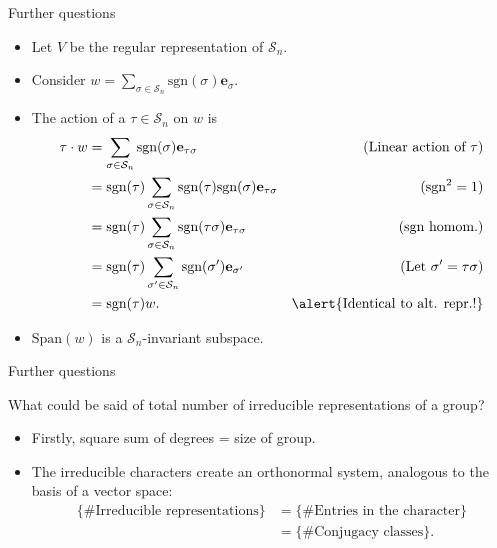 \documentclass[10pt]{beamer}
\newcommand{\Sym}{\mathcal{S}}
\newcommand{\sgn}{\text{sgn}}
\newcommand{\bas}{\mathbf{e}}
\newcommand{\Span}{\text{Span}}
\begin{document}
\begin{frame}{Further questions}
	\begin{example}
		\begin{itemize}
			\item Let $V$ be the regular representation of $\Sym_n$.
			
			\item Consider $w = \sum_{\sigma \in \Sym_n} \sgn(\sigma)\bas_\sigma$.
			
			\item The action of a $\tau \in \Sym_n$ on $w$ is \begin{align*}
				\tau \cdot w &= \sum_{\sigma \in \Sym_n} \sgn(\sigma)\bas_{\tau\sigma} & \text{(Linear action of $\tau$)} \\ 
				&= \sgn(\tau)\sum_{\sigma \in \Sym_n} \sgn(\tau)\sgn(\sigma)\bas_{\tau\sigma} & \text{($\sgn^2 = 1$)}\\
				&= \sgn(\tau)\sum_{\sigma \in \Sym_n} \sgn(\tau\sigma)\bas_{\tau\sigma} & \text{(sgn homom.)} \\
				&= \sgn(\tau)\sum_{\sigma' \in \Sym_n} \sgn(\sigma')\bas_{\sigma'} & \text{(Let $\sigma' = \tau\sigma$)} \\
				&= \sgn(\tau) w. & \text{\alert{Identical to alt. repr.!}}
			\end{align*}	
			
			
			\item $\Span(w)$ is a $\Sym_n$-invariant subspace.
		\end{itemize}
		\end{example}
\end{frame}

\begin{frame}{Further questions}
	\begin{block}{What could be said of total number of irreducible representations of a group?}
		\begin{itemize}
			\item Firstly, square sum of degrees = size of group.
			
			\item The irreducible characters create an orthonormal system, analogous to the basis of a vector space:
			\begin{align*}
									\{\text{\# Irreducible representations}\} &= \{\text{\# Entries in the character}\} \\
									&= \{\text{\# Conjugacy classes}\}.
			\end{align*}
		\end{itemize}
	\end{block}
\end{frame}
\end{document}
